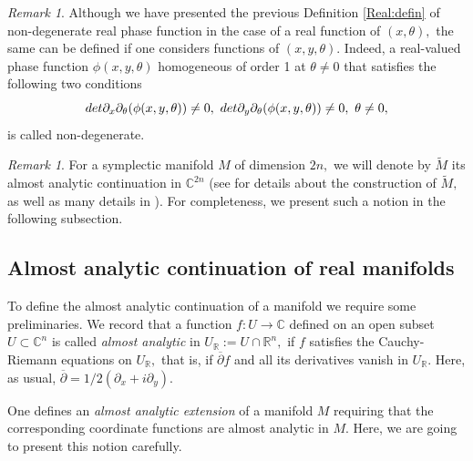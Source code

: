 \documentclass[12pt, reqno]{amsart}
\theoremstyle{definition}
\theoremstyle{remark}
\newtheorem{remark}[theorem]{Remark}
\numberwithin{equation}{section}
\begin{document}
\begin{remark} Although we have presented the previous Definition \ref{Real:defin} of non-degenerate real phase function in the case of a real function of  $(x,\theta),$ the same can be defined if one considers functions of $(x,y,\theta).$ Indeed, a real-valued phase function $\phi(x,y,\theta)$ homogeneous of order 1 at $\theta\neq 0$  that satisfies the following two conditions
 \begin{equation}
        \textnormal{det}\partial_x \partial_\theta(\phi(x,y,\theta))\neq 0,\,\, \textnormal{det}\partial_y \partial_\theta(\phi(x,y,\theta))\neq 0,\,\,\theta\neq 0,
    \end{equation} is called  non-degenerate. 
\end{remark}
\begin{remark}
 For a symplectic manifold $M$ of dimension $2n,$ we will denote by $\widetilde{M}$ its almost analytic continuation in $\mathbb{C}^{2n}$ (see   \cite[Page 10]{Ruzhansky:CWI-book} for details about the construction of $\widetilde{M},$ as well as many details in \cite{Melin:Sjostrand1975}). For completeness, we present such a notion in the following subsection.
\end{remark}
\subsection{Almost analytic continuation of real manifolds}\label{2:2} To define the almost analytic continuation of a manifold we require some preliminaries. We record that a function $f:U\to \mathbb{C}$ defined on an open subset $U\subset \mathbb{C}^n$ is called {\it almost analytic} in $U_{\mathbb{R}}:=U\cap \mathbb{R}^n,$ if $f$ satisfies the Cauchy-Riemann equations on $U_{\mathbb{R}},$ that is, if $\overline{\partial}f$ and all its derivatives vanish in $U_\mathbb{R}.$ Here, as usual, $\overline{\partial}=1/2(\partial_x+i\partial_y).$

One defines an {\it almost analytic extension} of a manifold $M$ requiring that the corresponding coordinate functions are almost analytic in $M.$ Here, we are going to present this notion carefully. 
\end{document}
